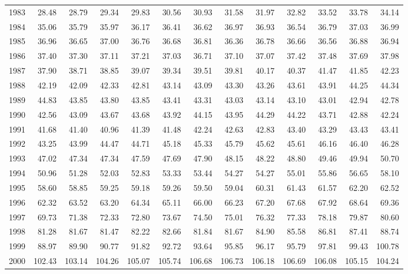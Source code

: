 \begin{longtable}{rrrrrrrrrrrrr}
  1983 & 28.48 & 28.79 & 29.34 & 29.83 & 30.56 & 30.93 & 31.58 & 31.97 & 32.82 & 33.52 & 33.78 & 34.14 \\ 
  1984 & 35.06 & 35.79 & 35.97 & 36.17 & 36.41 & 36.62 & 36.97 & 36.93 & 36.54 & 36.79 & 37.03 & 36.99 \\ 
  1985 & 36.96 & 36.65 & 37.00 & 36.76 & 36.68 & 36.81 & 36.36 & 36.78 & 36.66 & 36.56 & 36.88 & 36.94 \\ 
  1986 & 37.40 & 37.30 & 37.11 & 37.21 & 37.03 & 36.71 & 37.10 & 37.07 & 37.42 & 37.48 & 37.69 & 37.98 \\ 
  1987 & 37.90 & 38.71 & 38.85 & 39.07 & 39.34 & 39.51 & 39.81 & 40.17 & 40.37 & 41.47 & 41.85 & 42.23 \\ 
  1988 & 42.19 & 42.09 & 42.33 & 42.81 & 43.14 & 43.09 & 43.30 & 43.26 & 43.61 & 43.91 & 44.25 & 44.34 \\ 
  1989 & 44.83 & 43.85 & 43.80 & 43.85 & 43.41 & 43.31 & 43.03 & 43.14 & 43.10 & 43.01 & 42.94 & 42.78 \\ 
  1990 & 42.56 & 43.09 & 43.67 & 43.68 & 43.92 & 44.15 & 43.95 & 44.29 & 44.22 & 43.71 & 42.88 & 42.24 \\ 
  1991 & 41.68 & 41.40 & 40.96 & 41.39 & 41.48 & 42.24 & 42.63 & 42.83 & 43.40 & 43.29 & 43.43 & 43.41 \\ 
  1992 & 43.25 & 43.99 & 44.47 & 44.71 & 45.18 & 45.33 & 45.79 & 45.62 & 45.61 & 46.16 & 46.40 & 46.28 \\ 
  1993 & 47.02 & 47.34 & 47.34 & 47.59 & 47.69 & 47.90 & 48.15 & 48.22 & 48.80 & 49.46 & 49.94 & 50.70 \\ 
  1994 & 50.96 & 51.28 & 52.03 & 52.83 & 53.33 & 53.44 & 54.27 & 54.27 & 55.01 & 55.86 & 56.65 & 58.10 \\ 
  1995 & 58.60 & 58.85 & 59.25 & 59.18 & 59.26 & 59.50 & 59.04 & 60.31 & 61.43 & 61.57 & 62.20 & 62.52 \\ 
  1996 & 62.32 & 63.52 & 63.20 & 64.34 & 65.11 & 66.00 & 66.23 & 67.20 & 67.68 & 67.92 & 68.64 & 69.36 \\ 
  1997 & 69.73 & 71.38 & 72.33 & 72.80 & 73.67 & 74.50 & 75.01 & 76.32 & 77.33 & 78.18 & 79.87 & 80.60 \\ 
  1998 & 81.28 & 81.67 & 81.47 & 82.22 & 82.66 & 81.84 & 81.67 & 84.90 & 85.58 & 86.81 & 87.41 & 88.74 \\ 
  1999 & 88.97 & 89.90 & 90.77 & 91.82 & 92.72 & 93.64 & 95.85 & 96.17 & 95.79 & 97.81 & 99.43 & 100.78 \\ 
  2000 & 102.43 & 103.14 & 104.26 & 105.07 & 105.74 & 106.68 & 106.73 & 106.18 & 106.69 & 106.08 & 105.15 & 104.24 \\ 

\end{longtable}
